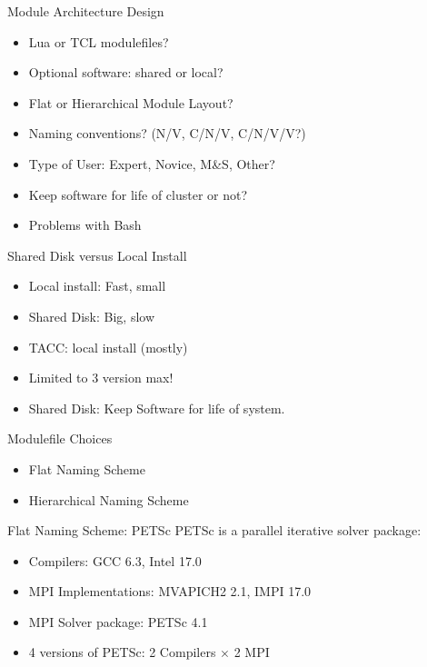 \documentclass[dvipsnames,aspectratio=169]{beamer}
\begin{document}
\begin{frame}{Module Architecture Design}
  \begin{itemize}
    \item Lua or TCL modulefiles?
    \item Optional software: shared or local?
    \item Flat or Hierarchical Module Layout?
    \item Naming conventions? (N/V, C/N/V, C/N/V/V?)
    \item Type of User: Expert, Novice, M\&S, Other?
    \item Keep software for life of cluster or not?
    \item Problems with Bash
  \end{itemize}
\end{frame}

\begin{frame}{Shared Disk versus Local Install}
  \begin{itemize}
    \item Local install: Fast, small 
    \item Shared Disk: Big, slow
    \item TACC: local install (mostly)
    \item Limited to 3 version max!
    \item Shared Disk: Keep Software for life of system.
  \end{itemize}
\end{frame}

\begin{frame}{Modulefile Choices}
  \begin{itemize}
    \item Flat Naming Scheme
    \item Hierarchical Naming Scheme
  \end{itemize}
\end{frame}

\begin{frame}{Flat Naming Scheme: PETSc}
  PETSc is a parallel iterative solver package:
  \begin{itemize}
    \item Compilers: GCC 6.3, Intel 17.0
    \item MPI Implementations: MVAPICH2 2.1, IMPI 17.0
    \item MPI Solver package: PETSc 4.1
    \item 4 versions of PETSc: 2 Compilers $\times$ 2 MPI
  \end{itemize}
\end{frame}
\end{document}
